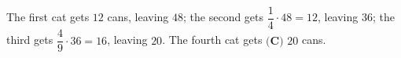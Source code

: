 The first cat gets $12$ cans, leaving $48$; the second gets $\dfrac14\cdot48=12$, leaving $36$; the third gets $\dfrac49\cdot36=16$, leaving $20$. The fourth cat gets $\boxed{\textbf{(C) }20}$ cans.
